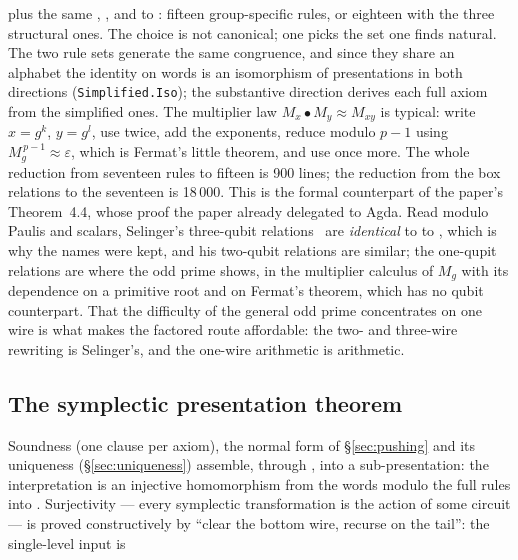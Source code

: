 plus the same , ,  and
 to : fifteen group-specific rules, or
eighteen with the three structural ones.  The choice is not canonical;
one picks the set one finds natural.  The two rule sets generate the
same congruence, and since they share an alphabet the identity on words
is an isomorphism of presentations in both directions
(\texttt{Simplified.Iso}); the substantive direction derives each full
axiom from the simplified ones.  The multiplier law $M_x \bullet M_y
\approx M_{xy}$ is typical: write $x = g^{k}$, $y = g^{l}$, use
 twice, add the exponents, reduce modulo $p-1$ using
$M_g^{\,p-1} \approx \varepsilon$, which is Fermat's little theorem, and
use  once more.  The whole reduction from seventeen rules
to fifteen is 900 lines; the reduction from the box relations to the
seventeen is 18\,000.  This is the formal counterpart of the paper's
Theorem~4.4, whose proof the paper already delegated to Agda.  Read
modulo Paulis and scalars, Selinger's three-qubit
relations~\cite{selinger2015clifford} are \emph{identical} to
 to , which is why the names were kept, and
his two-qubit relations are similar; the one-qupit relations are where
the odd prime shows, in the multiplier calculus of $M_g$ with its
dependence on a primitive root and on Fermat's theorem, which has no
qubit counterpart.  That the difficulty of the general odd prime
concentrates on one wire is what makes the factored route affordable:
the two- and three-wire rewriting is Selinger's, and the one-wire
arithmetic is arithmetic.

\subsection{The symplectic presentation theorem}\label{sec:sptheorem}

Soundness (one clause per axiom), the normal form of \S\ref{sec:pushing}
and its uniqueness (\S\ref{sec:uniqueness}) assemble, through
, into a sub-presentation: the interpretation is an
injective homomorphism from the words modulo the full rules into
.  Surjectivity --- every symplectic transformation is the
action of some circuit --- is proved constructively by ``clear the bottom
wire, recurse on the tail'': the single-level input is

